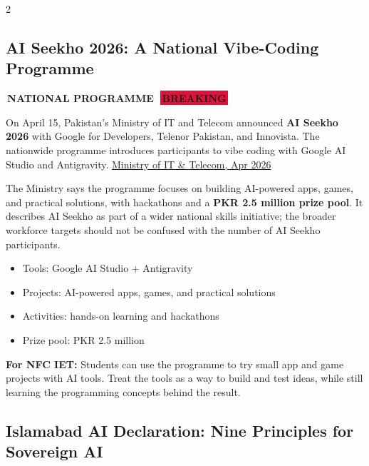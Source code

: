 \documentclass[10pt, a4paper]{article}
\newcommand{\sectiontag}[1]{%
  \noindent\colorbox{cobalt}{%
    \,\footnotesize\bfseries\color{white}\MakeUppercase{#1}\,}\,%
}
\newcommand{\hottag}{%
  \colorbox{crimson}{\,\scriptsize\bfseries\color{white}BREAKING\,}\ %
}
\newcommand{\ruled}{%
  \par\vspace{0.3em}%
  \noindent{\color{electric}\rule{\linewidth}{0.4pt}}\par
  \vspace{0.3em}}
\begin{document}
\begin{multicols}{2}

\subsection{AI Seekho 2026: A National Vibe-Coding Programme}

\sectiontag{National Programme}\quad\hottag

\medskip
{\small
On April 15, Pakistan's Ministry of IT and Telecom announced \textbf{AI Seekho 2026} with Google for Developers, Telenor Pakistan, and Innovista. The nationwide programme introduces participants to vibe coding with Google AI Studio and Antigravity.
\href{https://www.moitt.gov.pk/NewsDetail/NjRhZWNhZGQtZGRkNC00MmJiLTk5YjctNmU0MTA0MjZhYTFi}{Ministry of IT \& Telecom, Apr 2026}

The Ministry says the programme focuses on building AI-powered apps, games, and practical solutions, with hackathons and a \textbf{PKR 2.5 million prize pool}. It describes AI Seekho as part of a wider national skills initiative; the broader workforce targets should not be confused with the number of AI Seekho participants.
}

\begin{insightbox}[title={\faCode\quad Programme Architecture}]
  \begin{itemize}[label=\textbullet, itemsep=2pt, leftmargin=*]
    \item {\small Tools: Google AI Studio + Antigravity}
    \item {\small Projects: AI-powered apps, games, and practical solutions}
    \item {\small Activities: hands-on learning and hackathons}
    \item {\small Prize pool: PKR 2.5 million}
  \end{itemize}
\end{insightbox}

{\small
\textbf{For NFC IET:} Students can use the programme to try small app and game projects with AI tools. Treat the tools as a way to build and test ideas, while still learning the programming concepts behind the result.
}

\ruled

\subsection{Islamabad AI Declaration: Nine Principles for Sovereign AI}


\end{multicols}
\end{document}
